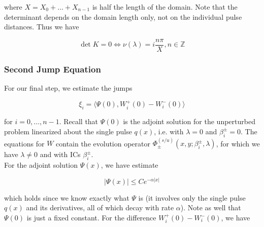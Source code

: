 \documentclass[12pt]{article}
\def\Z{{\mathbb Z}}
\begin{document}
where $X = X_0 + \dots + X_{n-1}$ is half the length of the domain. Note that the determinant depends on the domain length only, not on the individual pulse distances. Thus we have

\[
\det K = 0 \iff \nu(\lambda) = i \frac{n \pi}{X}, n \in \Z
\]

\subsubsection{Second Jump Equation}

For our final step, we estimate the jumps

\begin{equation}
\xi_i = \langle \Psi(0), W_i^+(0) - W_i^-(0) \rangle 
\end{equation}

for $i = 0, \dots, n-1$. Recall that $\Psi(0)$ is the adjoint solution for the unperturbed problem linearized about the single pulse $q(x)$, i.e. with $\lambda = 0$ and $\beta_i^\pm = 0$. The equations for $W$ contain the evolution operator $\Phi^{(s/u)}_\pm(x, y; \beta_i^\pm, \lambda)$, for which we have $\lambda \neq 0$ and with ICs $\beta_i^\pm$.\\

For the adjoint solution $\Psi(x)$, we have estimate 

\begin{equation}
|\Psi(x)| \leq C e^{-\alpha|x|}
\end{equation}

which holds since we know exactly what $\Psi$ is (it involves only the single pulse $q(x)$ and its derivatives, all of which decay with rate $\alpha$). Note as well that $\Psi(0)$ is just a fixed constant. For the difference $W_i^+(0) - W_i^-(0)$, we have
\end{document}
